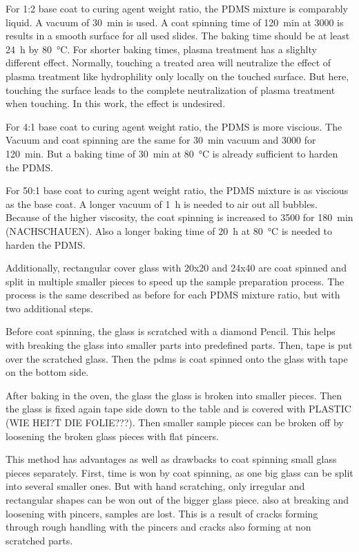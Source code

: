 For 1:2 base coat to curing agent weight ratio, the PDMS mixture is comparably liquid. A vacuum of \SI{30}{\minute} is used. A coat spinning time of \SI{120}{\minute} at \SI{3000}{\rpm} is results in a smooth surface for all used slides. The baking time should be at least \SI{24}{\hour} by \SI{80}{\degreeCelsius}. For shorter baking times, plasma treatment has a slighlty different effect. Normally, touching a treated area will neutralize the effect of plasma treatment like hydrophility only locally on the touched surface. But here, touching the surface leads to the complete neutralization of plasma treatment when touching. In this work, the effect is undesired. 
 
For 4:1 base coat to curing agent weight ratio, the PDMS is more viscious. The Vacuum and coat spinning are the same for \SI{30}{\minute} vacuum and \SI{3000}{\rpm} for \SI{120}{\minute}. But a baking time of \SI{30}{\minute} at \SI{80}{\degreeCelsius} is already sufficient to harden the PDMS. 

For 50:1 base coat to curing agent weight ratio, the PDMS mixture is as viscious as the base coat. A longer vacuum of \SI{1}{\hour} is needed to air out all bubbles. Because of the higher viscosity, the coat spinning is increased to \SI{3500}{\rpm} for \SI{180}{\minute} (NACHSCHAUEN). Also a longer baking time of \SI{20}{\hour} at \SI{80}{\degreeCelsius} is needed to harden the PDMS. 

Additionally, rectangular cover glass with 20x20 and 24x40 are coat spinned and split in multiple smaller pieces to speed up the sample preparation process. The process is the same described as before for each PDMS mixture ratio, but with two additional steps.

Before coat spinning, the glass is scratched with a diamond Pencil. This helps with breaking the glass into smaller parts into predefined parts. Then, tape is put over the scratched glass. Then the pdms is coat spinned onto the glass with tape on the bottom side. 

After baking in the oven, the glass the glass is broken into smaller pieces. Then the glass is fixed again tape side down to the table and is covered with PLASTIC (WIE HEI?T DIE FOLIE???). Then smaller sample pieces can be broken off by loosening the broken glass pieces with flat pincers.

This method has advantages as well as drawbacks to coat spinning small glass pieces separately. First, time is won by coat spinning, as one big glass can be split into several smaller ones. But with hand scratching, only irregular and rectangular shapes can be won out of the bigger glass piece. also at breaking and loosening with pincers, samples are lost. This is a result of cracks forming through rough handling with the pincers and cracks also forming at non scratched parts.

